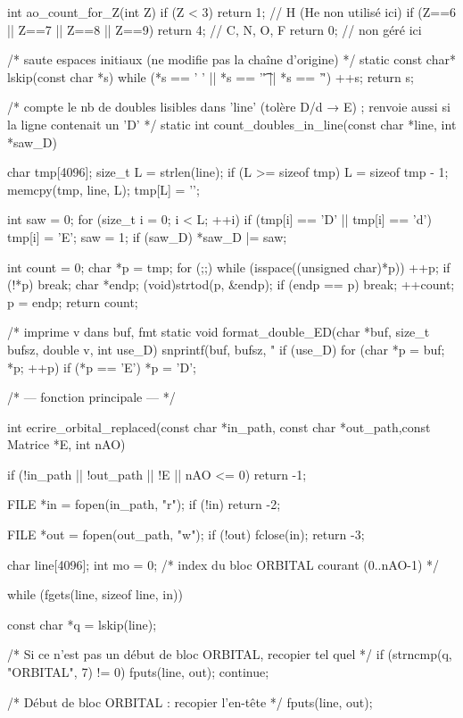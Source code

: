 \documentclass[12pt]{article}
\begin{document}
\begin{C}
int ao_count_for_Z(int Z) {
    if (Z < 3) return 1;                       // H (He non utilisé ici)
    if (Z==6 || Z==7 || Z==8 || Z==9) return 4; // C, N, O, F
    return 0; // non géré ici
}

/* saute espaces initiaux (ne modifie pas la chaîne d'origine) */
static const char* lskip(const char *s) {
    while (*s == ' ' || *s == '\t' || *s == '\r') ++s;
    return s;
}

/* compte le nb de doubles lisibles dans 'line' (tolère D/d → E) ;
   renvoie aussi si la ligne contenait un 'D' */
static int count_doubles_in_line(const char *line, int *saw_D) {
    char tmp[4096];
    size_t L = strlen(line);
    if (L >= sizeof tmp) L = sizeof tmp - 1;
    memcpy(tmp, line, L); tmp[L] = '\0';

    int saw = 0;
    for (size_t i = 0; i < L; ++i) {
        if (tmp[i] == 'D' || tmp[i] == 'd') { tmp[i] = 'E'; saw = 1; }
    }
    if (saw_D) *saw_D |= saw;

    int count = 0;
    char *p = tmp;
    for (;;) {
        while (isspace((unsigned char)*p)) ++p;
        if (!*p) break;
        char *endp;
        (void)strtod(p, &endp);
        if (endp == p) break;
        ++count;
        p = endp;
    }
    return count;
}

/* imprime v dans buf, fmt %
static void format_double_ED(char *buf, size_t bufsz, double v, int use_D) {
    snprintf(buf, bufsz, "%
    if (use_D) {
        for (char *p = buf; *p; ++p) if (*p == 'E') *p = 'D';
    }
}

/* --- fonction principale --- */

int ecrire_orbital_replaced(const char *in_path, const char *out_path,const Matrice *E, int nAO)
{
    if (!in_path || !out_path || !E || nAO <= 0) return -1;

    FILE *in = fopen(in_path, "r");
    if (!in) return -2;

    FILE *out = fopen(out_path, "w");
    if (!out) { fclose(in); return -3; }

    char line[4096];
    int mo = 0; /* index du bloc ORBITAL courant (0..nAO-1) */

    while (fgets(line, sizeof line, in)) {
        const char *q = lskip(line);

        /* Si ce n'est pas un début de bloc ORBITAL, recopier tel quel */
        if (strncmp(q, "ORBITAL", 7) != 0) {
            fputs(line, out);
            continue;
        }

        /* Début de bloc ORBITAL : recopier l'en-tête */
        fputs(line, out);

}}
\end{C}
\end{document}
